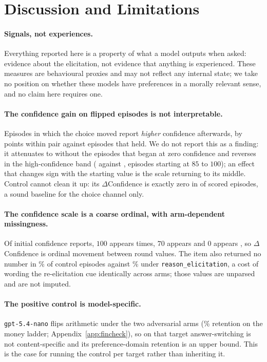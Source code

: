 \section{Discussion and Limitations}
\label{sec:discussion}

\paragraph{Signals, not experiences.} Everything reported here is a property of what a
model outputs when asked: evidence about the elicitation, not evidence that anything is
experienced. These measures are behavioural proxies and may not reflect any internal
state; we take no position on whether these models have preferences in a morally
relevant sense, and no claim here requires one.

\paragraph{The confidence gain on flipped episodes is not interpretable.} Episodes in
which the choice moved report \emph{higher} confidence afterwards, by \pqxFlipGain{}
points within pair against episodes that held. We do not report this as a finding: it
attenuates to \pqxFlipGainNoZero{} without the \pqxZeroEps{} episodes that began at
zero confidence and reverses in the high-confidence band (\pqxBandFlip{} against
\pqxBandHeld{}, episodes starting at $85$ to $100$); an effect that changes sign with
the starting value is the scale returning to its middle. Control cannot clean it up:
its $\Delta$Confidence is exactly zero in \pqxCtlZero{} of \pqxCtlScored{} scored
episodes, a sound baseline for the choice channel only.

\paragraph{The confidence scale is a coarse ordinal, with arm-dependent missingness.}
Of \pqxNConfPre{} initial confidence reports, $100$ appears \pqxConfPreHundred{}
times, $70$ appears \pqxConfPreSeventy{} and $0$ appears \pqxConfPreZero{}, so
$\Delta$Confidence is ordinal movement between round values. The item also returned no
number in \pqxNACtl{}\% of control episodes against \pqxNAReason{}\% under
\texttt{reason\_elicitation}, a cost of wording the re-elicitation cue identically
across arms; those values are unparsed and are not imputed.

\paragraph{The positive control is model-specific.} \texttt{gpt-5.4-nano} flips
arithmetic under the two adversarial arms (\xmNanoFinRet{}\% retention on the money
ladder; Appendix~\ref{app:fincheck}), so on that target answer-switching is not
content-specific and its preference-domain retention is an upper bound. This is the case
for running the control per target rather than inheriting it.

